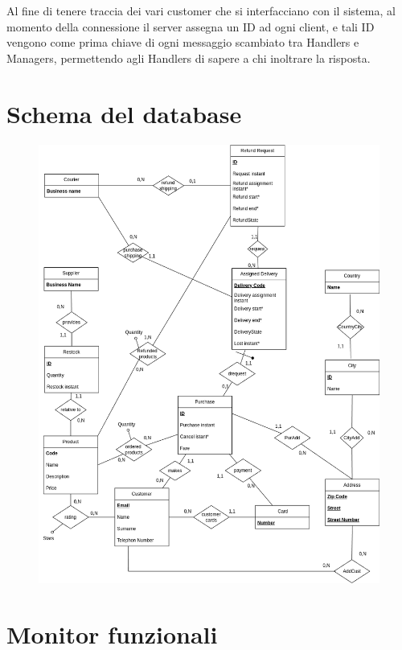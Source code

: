 \documentclass[12pt]{report}
\begin{document}
    Al fine di tenere traccia dei vari customer che si interfacciano con il sistema, al momento della connessione il server assegna un ID ad ogni client, e tali ID vengono come prima chiave di ogni messaggio scambiato tra Handlers e Managers, permettendo agli Handlers di sapere a chi inoltrare la risposta.

    \newpage
    
    \section{Schema del database}
    
    \begin{figure}[H]
        \centering
        \includegraphics[scale=0.45]{images/ER-Restructured.png}
        
        \label{fig:message_sequence_chart}
    \end{figure}

    \newpage
    
    \section{Monitor funzionali}
\end{document}
